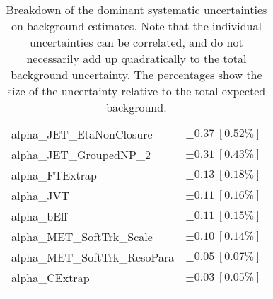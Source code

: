 \begin{table}
\begin{center}
\begin{tabular*}{\textwidth}{@{\extracolsep{\fill}}lc}
alpha\_JET\_EtaNonClosure         & $\pm 0.37\ [0.52\%] $       \\
alpha\_JET\_GroupedNP\_2         & $\pm 0.31\ [0.43\%] $       \\
alpha\_FTExtrap         & $\pm 0.13\ [0.18\%] $       \\
alpha\_JVT         & $\pm 0.11\ [0.16\%] $       \\
alpha\_bEff         & $\pm 0.11\ [0.15\%] $       \\
alpha\_MET\_SoftTrk\_Scale         & $\pm 0.10\ [0.14\%] $       \\
alpha\_MET\_SoftTrk\_ResoPara         & $\pm 0.05\ [0.07\%] $       \\
alpha\_CExtrap         & $\pm 0.03\ [0.05\%] $       \\
\noalign{\smallskip}\hline\noalign{\smallskip}
\end{tabular*}
\end{center}
\caption[Breakdown of uncertainty on background estimates]{
Breakdown of the dominant systematic uncertainties on background estimates.
Note that the individual uncertainties can be correlated, and do not necessarily add up quadratically to 
the total background uncertainty. The percentages show the size of the uncertainty relative to the total expected background.
\label{table.results.bkgestimate.uncertainties.VRZD}}
\end{table}
%